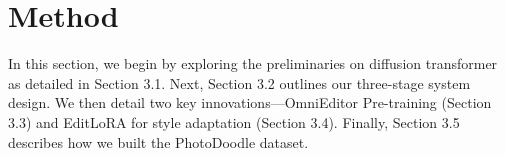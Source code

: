 
\section{Method}
In this section, we begin by exploring the preliminaries on diffusion transformer as detailed in Section 3.1. Next, Section 3.2 outlines our three-stage system design. We then detail two key innovations—OmniEditor Pre-training (Section 3.3) and EditLoRA for style adaptation (Section 3.4). Finally, Section 3.5 describes how we built the PhotoDoodle dataset. 








